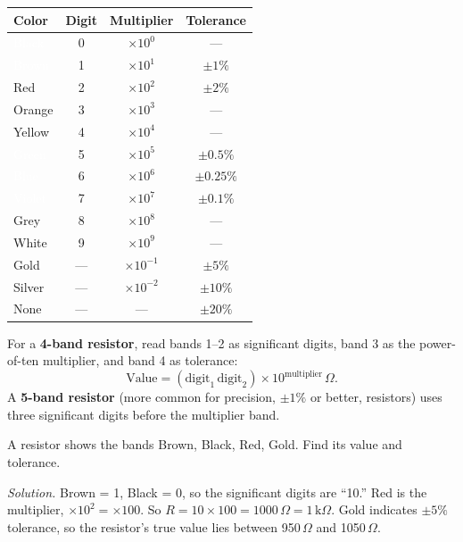 \begin{center}
\renewcommand{\arraystretch}{1.15}
\begin{tabular}{@{}lccc@{}}
\toprule
Color & Digit & Multiplier & Tolerance \\
\midrule
\cellcolor{black!85}\textcolor{white}{Black} & 0 & $\times 10^{0}$ & --- \\
\cellcolor{brown!70!black}\textcolor{white}{Brown} & 1 & $\times 10^{1}$ & $\pm 1\%$ \\
\cellcolor{red}Red & 2 & $\times 10^{2}$ & $\pm 2\%$ \\
\cellcolor{orange}Orange & 3 & $\times 10^{3}$ & --- \\
\cellcolor{yellow}Yellow & 4 & $\times 10^{4}$ & --- \\
\cellcolor{green!70!black}\textcolor{white}{Green} & 5 & $\times 10^{5}$ & $\pm 0.5\%$ \\
\cellcolor{blue}\textcolor{white}{Blue} & 6 & $\times 10^{6}$ & $\pm 0.25\%$ \\
\cellcolor{violet}\textcolor{white}{Violet} & 7 & $\times 10^{7}$ & $\pm 0.1\%$ \\
\cellcolor{gray!60}Grey & 8 & $\times 10^{8}$ & --- \\
White & 9 & $\times 10^{9}$ & --- \\
\cellcolor{yellow!70!orange}Gold & --- & $\times 10^{-1}$ & $\pm 5\%$ \\
\cellcolor{gray!30}Silver & --- & $\times 10^{-2}$ & $\pm 10\%$ \\
None & --- & --- & $\pm 20\%$ \\
\bottomrule
\end{tabular}
\end{center}

For a \textbf{4-band resistor}, read bands 1--2 as significant digits,
band 3 as the power-of-ten multiplier, and band 4 as tolerance:
\[
\text{Value} = (\text{digit}_1 \, \text{digit}_2) \times 10^{\text{multiplier}} \,\Omega.
\]
A \textbf{5-band resistor} (more common for precision, $\pm1\%$ or
better, resistors) uses three significant digits before the multiplier
band.

\begin{examplebox}
A resistor shows the bands Brown, Black, Red, Gold. Find its value and
tolerance.

\emph{Solution.} Brown = 1, Black = 0, so the significant digits are
``10.'' Red is the multiplier, $\times10^2 = \times100$. So
$R = 10 \times 100 = 1000\,\Omega = 1\,\text{k}\Omega$. Gold indicates
$\pm5\%$ tolerance, so the resistor's true value lies between 950\,$\Omega$
and 1050\,$\Omega$.
\end{examplebox}

